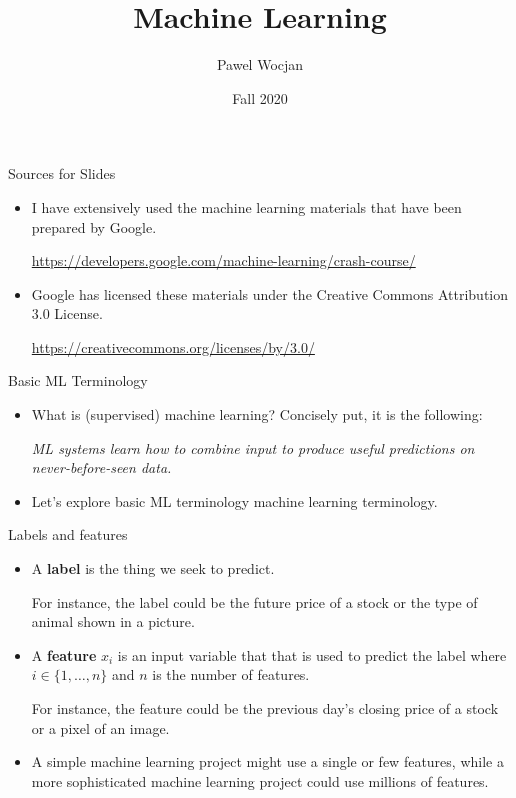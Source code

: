 \documentclass{beamer}
\title[ML]{Machine Learning}
\author{Pawel Wocjan}
\institute{University of Central Florida}
\date{Fall 2020}
\begin{document}
\begin{frame}
  \titlepage
\end{frame}

\begin{frame}{Sources for Slides}

\begin{itemize}
\item I have extensively used the machine learning materials that have been prepared by Google. 

\medskip
\footnotesize{ 
\url{https://developers.google.com/machine-learning/crash-course/}
}

\item Google has licensed these materials under the Creative Commons Attribution 3.0 License.

\medskip
\footnotesize{ 
\url{https://creativecommons.org/licenses/by/3.0/}
}
\end{itemize}
\end{frame}


\begin{frame}{Basic ML Terminology}

\begin{itemize}
\item What is (supervised) machine learning? Concisely put, it is the following:

\medskip
\emph{ML systems learn how to combine input to produce useful predictions on never-before-seen data.}

\medskip
\item Let's explore basic ML terminology machine learning terminology.
\end{itemize}
\end{frame}


\begin{frame}{Labels and features}

\begin{itemize}
\item 
A {\bf label} is the thing we seek to predict.

\medskip
For instance, the label could be the future price of a stock or the type of animal shown in a picture.

\medskip
\item 
A {\bf feature} $x_i$ is an input variable that that is used to predict the label where $i\in\{1,\ldots,n\}$ and $n$ is the number of features.

\medskip
For instance, the feature could be the previous day's closing price of a stock or a pixel of an image.

\medskip
\item A simple machine learning project might use a single or few features, while a more sophisticated machine learning project could use millions of features. 
\end{itemize}

\end{frame}
\end{document}
